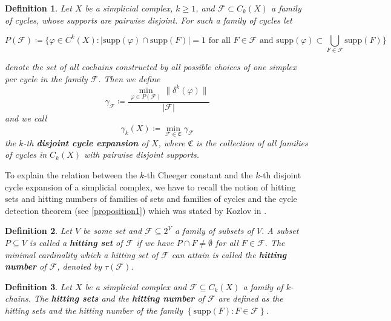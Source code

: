 \documentclass{article}
\newcommand{\supp}{\mathrm{supp}}
\newtheorem{defi}{Definition}[section]
\begin{document}
\begin{defi}
Let $X$ be a simplicial complex, $k\geq 1$, and $\mathcal{F}\subset C_k(X)$ a family of cycles, whose supports are pairwise disjoint. For such a family of cycles let
\begin{footnotesize}
\[
P(\mathcal{F})\coloneqq\{\varphi\in C^k(X):|\supp(\varphi)\cap\supp(F)|=1\text{ for all }F\in\mathcal{F}\text{ and }\supp(\varphi)\subset\bigcup\limits_{F\in\mathcal{F}}\supp(F)\}
\]
\end{footnotesize}
denote the set of all cochains constructed by all possible choices of one simplex per cycle in the family $\mathcal{F}$. Then we define
\[
\gamma_{\mathcal{F}}\coloneqq\frac{\min\limits_{\varphi\in P(\mathcal{F})}\|\delta^k(\varphi)\|}{|\mathcal{F}|}
\]
and we call
\[
\gamma_k(X)\coloneqq\min\limits_{\mathcal{F}\in\mathfrak{C}}\gamma_{\mathcal{F}}
\]
the $k$-th \textbf{disjoint cycle expansion} of $X$, where $\mathfrak{C}$ is the collection of all families of cycles in $C_k(X)$ with pairwise disjoint supports.
\end{defi}

To explain the relation between the $k$-th Cheeger constant and the $k$-th disjoint cycle expansion of a simplicial complex, we have to recall the notion of hitting sets and hitting numbers of families of sets and families of cycles and the cycle detection theorem (see \ref{proposition1}) which was stated by Kozlov in \cite{1}.

\begin{defi}
Let $V$ be some set and $\mathcal{F}\subseteq 2^V$ a family of subsets of $V$. A subset $P\subseteq V$ is called a \textbf{hitting set} of $\mathcal{F}$ if we have $P\cap F\neq\emptyset$ for all $F\in\mathcal{F}$. The minimal cardinality which a hitting set of $\mathcal{F}$ can attain is called the \textbf{hitting number} of $\mathcal{F}$, denoted by $\tau(\mathcal{F})$.
\end{defi}

\begin{defi}
Let \(X\) be a simplicial complex and \(\mathcal{F}\subseteq C_k(X)\) a family of \(k\)-chains. The \textbf{hitting sets} and the \textbf{hitting number} of \(\mathcal{F}\) are defined as the hitting sets and the hitting number of the family \(\left\{\supp(F):F\in\mathcal{F}\right\}\).
\end{defi}
\end{document}
